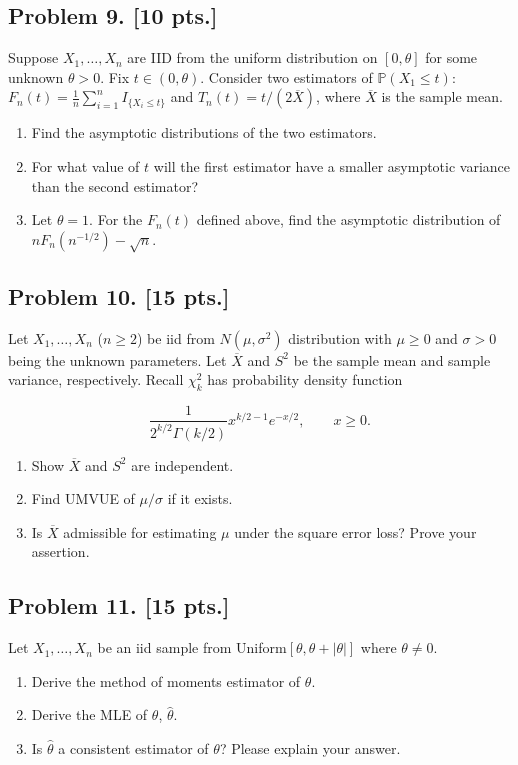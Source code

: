 \documentclass[11pt,a4paper]{article}
\begin{document}
\subsection{Problem 9. [10 pts.]}
Suppose \( X_1, \dots, X_n \) are IID from the uniform distribution on \( [0, \theta] \) for some unknown \( \theta > 0 \). Fix \( t \in (0, \theta) \). Consider two estimators of \( \mathbb{P}(X_1 \le t) \): \( F_n(t) = \frac{1}{n} \sum_{i=1}^n I_{\{X_i \le t\}} \) and \( T_n(t) = t/(2\overline{X}) \), where \( \overline{X} \) is the sample mean.
\begin{enumerate}[label=(\alph*)]
    \item Find the asymptotic distributions of the two estimators.
    \item For what value of \( t \) will the first estimator have a smaller asymptotic variance than the second estimator?
    \item Let \( \theta = 1 \). For the \( F_n(t) \) defined above, find the asymptotic distribution of \( n F_n(n^{-1/2}) - \sqrt{n} \).
\end{enumerate}

\subsection{Problem 10. [15 pts.]}
Let \( X_1, \dots, X_n \) (\( n \ge 2 \)) be iid from \( N(\mu, \sigma^2) \) distribution with \( \mu \ge 0 \) and \( \sigma > 0 \) being the unknown parameters. Let \( \overline{X} \) and \( S^2 \) be the sample mean and sample variance, respectively. Recall \( \chi^2_k \) has probability density function

\[
\frac{1}{2^{k/2} \Gamma(k/2)} x^{k/2 - 1} e^{-x/2}, \qquad x \ge 0.
\]

\begin{enumerate}[label=(\alph*)]
    \item Show \( \overline{X} \) and \( S^2 \) are independent.
    \item Find UMVUE of \( \mu/\sigma \) if it exists.
    \item Is \( \overline{X} \) admissible for estimating \( \mu \) under the square error loss? Prove your assertion.
\end{enumerate}

\subsection{Problem 11. [15 pts.]}
Let \( X_1, \dots, X_n \) be an iid sample from Uniform\( [\theta, \theta + |\theta|] \) where \( \theta \neq 0 \).
\begin{enumerate}[label=(\alph*)]
    \item Derive the method of moments estimator of \( \theta \).
    \item Derive the MLE of \( \theta \), \( \hat{\theta} \).
    \item Is \( \hat{\theta} \) a consistent estimator of \( \theta \)? Please explain your answer.
\end{enumerate}
\end{document}
